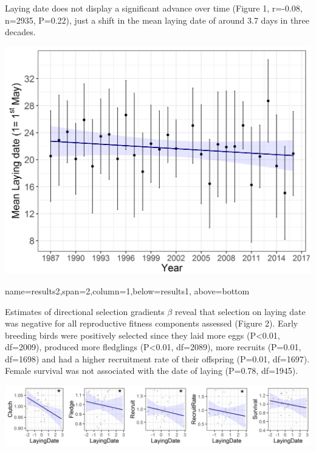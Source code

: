 \documentclass[a0paper,portrait]{baposter}
\begin{document}
\begin{poster}
{Laying date does not display a significant advance over time (Figure 1, r=-0.08, n=2935, P=0.22), just a shift in the mean laying date of around 3.7 days in three decades. 


\begin{center}
\includegraphics[width=0.47\linewidth]{Figure1_1}
\end{center}

}

 {name=results2,span=2,column=1,below=results1, above=bottom}{%

Estimates of directional selection gradients $\beta$ reveal that selection on laying date was negative for all reproductive fitness components assessed (Figure 2).
Early breeding birds were positively selected since they laid more eggs (P<0.01, df=2009), produced more fledglings (P<0.01, df=2089), more recruits (P=0.01, df=1698) and had a higher recruitment rate of their offspring (P=0.01, df=1697). Female survival was not associated with the date of laying (P=0.78, df=1945).
 


\begin{center}
\includegraphics[width=0.90\linewidth]{Figure2_1}
\end{center}

}
\end{poster}
\end{document}
